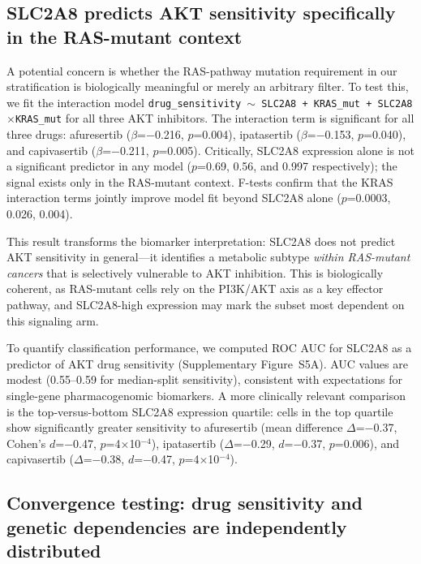 \documentclass[12pt]{article}
\begin{document}
\subsection{SLC2A8 predicts AKT sensitivity specifically in the
RAS-mutant context}

A potential concern is whether the RAS-pathway mutation requirement in
our stratification is biologically meaningful or merely an arbitrary
filter. To test this, we fit the interaction model
\texttt{drug\_sensitivity $\sim$ SLC2A8 + KRAS\_mut +
SLC2A8$\times$KRAS\_mut} for all three AKT inhibitors. The interaction
term is significant for all three drugs: afuresertib ($\beta$=$-$0.216,
$p$=0.004), ipatasertib ($\beta$=$-$0.153, $p$=0.040), and capivasertib
($\beta$=$-$0.211, $p$=0.005). Critically, SLC2A8 expression alone is
not a significant predictor in any model ($p$=0.69, 0.56, and 0.997
respectively); the signal exists only in the RAS-mutant context. F-tests
confirm that the KRAS interaction terms jointly improve model fit beyond
SLC2A8 alone ($p$=0.0003, 0.026, 0.004).

This result transforms the biomarker interpretation: SLC2A8 does not
predict AKT sensitivity in general---it identifies a metabolic subtype
\emph{within RAS-mutant cancers} that is selectively vulnerable to AKT
inhibition. This is biologically coherent, as RAS-mutant cells rely
on the PI3K/AKT axis as a key effector pathway, and SLC2A8-high
expression may mark the subset most dependent on this signaling arm.

To quantify classification performance, we computed ROC AUC for SLC2A8
as a predictor of AKT drug sensitivity (Supplementary Figure~S5A). AUC
values are modest (0.55--0.59 for median-split sensitivity), consistent
with expectations for single-gene pharmacogenomic biomarkers. A more
clinically relevant comparison is the top-versus-bottom SLC2A8 expression
quartile: cells in the top quartile show significantly greater sensitivity
to afuresertib (mean difference $\Delta$=$-$0.37, Cohen's $d$=$-$0.47,
$p$=4$\times$10$^{-4}$), ipatasertib ($\Delta$=$-$0.29, $d$=$-$0.37,
$p$=0.006), and capivasertib ($\Delta$=$-$0.38, $d$=$-$0.47,
$p$=4$\times$10$^{-4}$).

\subsection{Convergence testing: drug sensitivity and genetic
dependencies are independently distributed}
\end{document}
